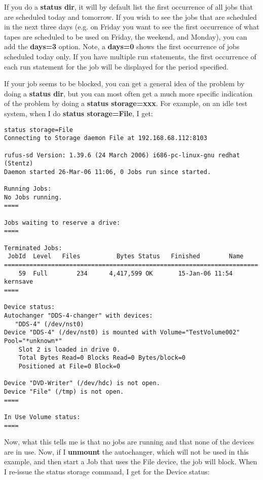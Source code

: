 \begin{description}
   If you do a {\bf status dir}, it will by default list the first
   occurrence of all jobs that are scheduled today and tomorrow.  If you
   wish to see the jobs that are scheduled in the next three days (e.g.  on
   Friday you want to see the first occurrence of what tapes are scheduled
   to be used on Friday, the weekend, and Monday), you can add the {\bf
   days=3} option.  Note, a {\bf days=0} shows the first occurrence of jobs
   scheduled today only.  If you have multiple run statements, the first
   occurrence of each run statement for the job will be displayed for the
   period specified.

   If your job seems to be blocked, you can get a general idea of the
   problem by doing a {\bf status dir}, but you can most often get a 
   much more specific indication of the problem by doing a
   {\bf status storage=xxx}.  For example, on an idle test system, when
   I do {\bf status storage=File}, I get:
\footnotesize
\begin{verbatim}
status storage=File
Connecting to Storage daemon File at 192.168.68.112:8103

rufus-sd Version: 1.39.6 (24 March 2006) i686-pc-linux-gnu redhat (Stentz)
Daemon started 26-Mar-06 11:06, 0 Jobs run since started.

Running Jobs:
No Jobs running.
====

Jobs waiting to reserve a drive:
====

Terminated Jobs:
 JobId  Level   Files          Bytes Status   Finished        Name 
======================================================================
    59  Full        234      4,417,599 OK       15-Jan-06 11:54 kernsave
====

Device status:
Autochanger "DDS-4-changer" with devices:
   "DDS-4" (/dev/nst0)
Device "DDS-4" (/dev/nst0) is mounted with Volume="TestVolume002"
Pool="*unknown*"
    Slot 2 is loaded in drive 0.
    Total Bytes Read=0 Blocks Read=0 Bytes/block=0
    Positioned at File=0 Block=0

Device "DVD-Writer" (/dev/hdc) is not open.
Device "File" (/tmp) is not open.
====

In Use Volume status:
====
\end{verbatim}
\normalsize

Now, what this tells me is that no jobs are running and that none of
the devices are in use.  Now, if I {\bf unmount} the autochanger, which
will not be used in this example, and then start a Job that uses the
File device, the job will block.  When I re-issue the status storage
command, I get for the Device status:


\end{description}
